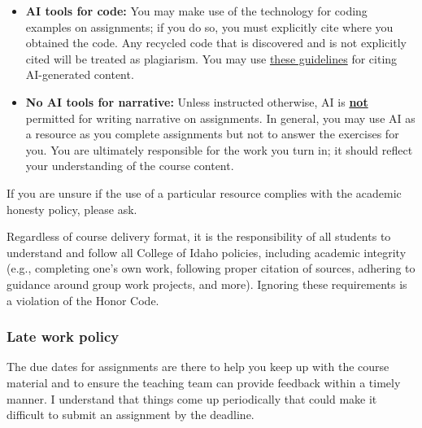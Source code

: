 \documentclass[
  letterpaper,
  DIV=11,
  numbers=noendperiod]{scrartcl}
\begin{document}
\begin{itemize}
  \begin{itemize}
  \item
    \textbf{AI tools for code:} You may make use of the technology for
    coding examples on assignments; if you do so, you must explicitly
    cite where you obtained the code. Any recycled code that is
    discovered and is not explicitly cited will be treated as
    plagiarism. You may use
    \href{https://guides.lib.monash.edu/c.php?g=219786&p=6972087}{these
    guidelines} for citing AI-generated content.
  \item
    \textbf{No AI tools for narrative:} Unless instructed otherwise, AI
    is \ul{\textbf{not}} permitted for writing narrative on assignments.
    In general, you may use AI as a resource as you complete assignments
    but not to answer the exercises for you. You are ultimately
    responsible for the work you turn in; it should reflect your
    understanding of the course content.
  \end{itemize}
\end{itemize}

If you are unsure if the use of a particular resource complies with the
academic honesty policy, please ask.

Regardless of course delivery format, it is the responsibility of all
students to understand and follow all College of Idaho policies,
including academic integrity (e.g., completing one's own work, following
proper citation of sources, adhering to guidance around group work
projects, and more). Ignoring these requirements is a violation of the
Honor Code.

\subsubsection{Late work policy}\label{late-work-policy}

The due dates for assignments are there to help you keep up with the
course material and to ensure the teaching team can provide feedback
within a timely manner. I understand that things come up periodically
that could make it difficult to submit an assignment by the deadline.
\end{document}
